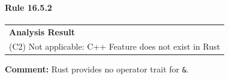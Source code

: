 \paragraph{Rule 16.5.2}
\begin{longtable}{p{13cm}}
\textbf{Analysis Result} \\
(C2) Not applicable: C++ Feature does not exist in Rust \\
\end{longtable}
\textbf{Comment:} Rust provides no operator trait for \texttt{\&}. \\
